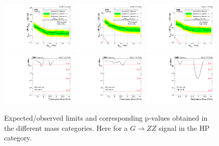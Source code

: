 \begin{figure}[h!]
\centering
\includegraphics[width=0.32\textwidth]{figures/analysis/search1/AN-15-211/limits/brazilianFlag_BulkZZ_WWHP_13TeV_wPDF.pdf}
\includegraphics[width=0.32\textwidth]{figures/analysis/search1/AN-15-211/limits/brazilianFlag_BulkZZ_WZHP_13TeV_wPDF.pdf}
\includegraphics[width=0.32\textwidth]{figures/analysis/search1/AN-15-211/limits/brazilianFlag_BulkZZ_ZZHP_13TeV_wPDF.pdf}\\
\includegraphics[width=0.32\textwidth]{figures/analysis/search1/AN-15-211/pvalues/pvalue_BulkZZinWW_high_purity.pdf}
\includegraphics[width=0.32\textwidth]{figures/analysis/search1/AN-15-211/pvalues/pvalue_BulkZZinWZ_high_purity.pdf}
\includegraphics[width=0.32\textwidth]{figures/analysis/search1/AN-15-211/pvalues/pvalue_BulkZZinZZ_high_purity.pdf}
\caption{Expected/observed limits and corresponding p-values obtained in the different mass categories. Here for a $G\rightarrow ZZ$ signal in the HP category.}
\label{fig:searchI:Limits_HPBulkZZ}
\end{figure}



